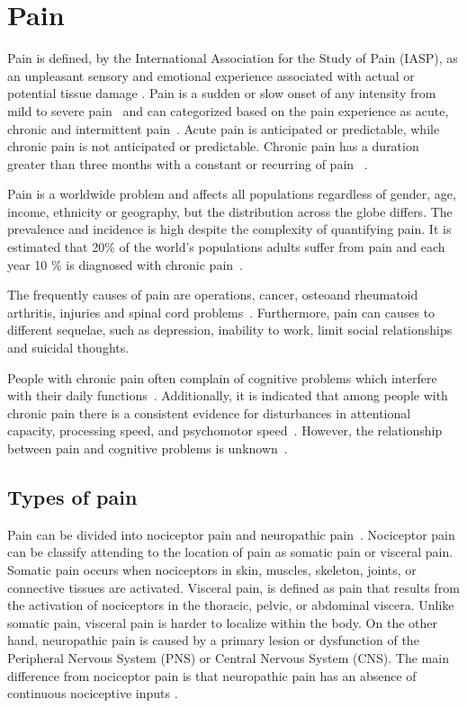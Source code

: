 \section{Pain}
Pain is defined, by the International Association for the Study of Pain (IASP), as an unpleasant sensory and emotional experience associated with actual or potential tissue damage \cite{(Marsky and Bogduk, 1994}. Pain is a sudden or slow onset of any intensity from mild to severe pain~\cite{Mello2016} and can categorized based on the pain experience as acute, chronic and intermittent pain~\cite{Goldberg2011}. Acute pain is anticipated or predictable, while  chronic pain is not anticipated or predictable. Chronic pain has a duration greater than three months with a constant or recurring of pain ~\cite{Mello2016}. 

Pain is a worldwide problem and affects all populations regardless of gender, age, income, ethnicity or geography, but the distribution across the globe differs\cite{Goldberg2011}. 
The prevalence and incidence is high despite the complexity of quantifying pain\cite{Goldberg2011}. It is estimated that 20\% of the world's populations adults suffer from pain and each year 10 \% is diagnosed with chronic pain~\cite{Goldberg2011}. 

The frequently causes of pain are operations, cancer, osteoand rheumatoid arthritis, injuries and spinal cord problems~\cite{Goldberg2011}. Furthermore, pain can causes to different sequelae, such as depression, inability to work, limit social relationships and suicidal thoughts\cite{Goldberg2011}. 

People with chronic pain often complain of cognitive problems which interfere with their daily functions~\cite{Geisser2018}. Additionally, it is indicated that among people with chronic pain there is a consistent evidence for disturbances in attentional capacity, processing speed, and psychomotor speed~\cite{Geisser2018}. However, the relationship between pain and cognitive problems is unknown~\cite{Geisser2018}. 

\subsection{Types of pain}
Pain can be divided into nociceptor pain and neuropathic pain~\cite{Steeds2013}. Nociceptor pain can be classify attending to the location of pain as somatic pain or visceral pain. Somatic pain occurs when nociceptors in skin, muscles, skeleton, joints, or connective tissues are activated. Visceral pain, is defined as pain that results from the activation of nociceptors in the thoracic, pelvic, or abdominal viscera. Unlike somatic pain, visceral pain is harder to localize within the body. On the other hand,%
 neuropathic pain is caused by a primary lesion or dysfunction of the Peripheral Nervous System (PNS) or Central Nervous System (CNS). The main difference from nociceptor pain is that neuropathic pain has an absence of continuous nociceptive inputs \cite{neuropathic pain}. 

